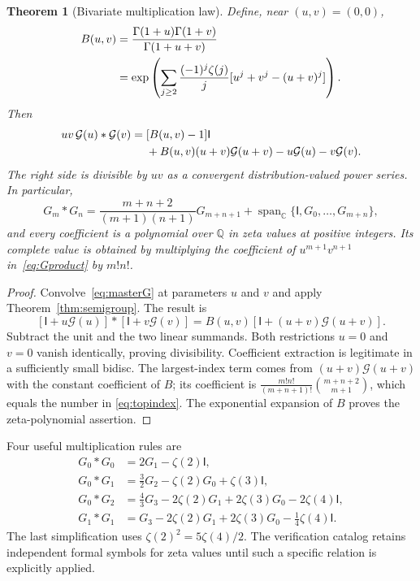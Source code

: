 \documentclass[11pt]{article}
\numberwithin{equation}{section}
\newtheorem{theorem}{Theorem}[section]
\theoremstyle{definition}
\theoremstyle{remark}
\newcommand{\C}{\mathbb C}
\newcommand{\Q}{\mathbb Q}
\newcommand{\Id}{\mathsf I}
\newcommand{\G}{\mathcal G}
\begin{document}
\begin{theorem}[Bivariate multiplication law]\label{thm:product}
Define, near $(u,v)=(0,0)$,
\begin{align}
 B(u,v)&=\frac{\Gamma(1+u)\Gamma(1+v)}{\Gamma(1+u+v)}\label{eq:Buv}\\
 &=\exp\left(\sum_{j\ge2}\frac{(-1)^j\zeta(j)}j
          [u^j+v^j-(u+v)^j]\right).\notag
\end{align}
Then
\begin{align}
 uv\,\G(u)*\G(v)={}&[B(u,v)-1]\Id\label{eq:Gproduct}\\
 &+B(u,v)(u+v)\G(u+v)-u\G(u)-v\G(v).\notag
\end{align}
The right side is divisible by $uv$ as a convergent distribution-valued
power series. In particular,
\begin{equation}\label{eq:topindex}
 G_m*G_n=\frac{m+n+2}{(m+1)(n+1)}G_{m+n+1}
       +\operatorname{span}_{\C}\{\Id,G_0,\ldots,G_{m+n}\},
\end{equation}
and every coefficient is a polynomial over $\Q$ in zeta values at positive
integers. Its complete value is obtained by multiplying the coefficient
of $u^{m+1}v^{n+1}$ in~\eqref{eq:Gproduct} by $m!n!$.
\end{theorem}
\begin{proof}
Convolve~\eqref{eq:masterG} at parameters $u$ and $v$ and apply
Theorem~\ref{thm:semigroup}. The result is
\[
 [\Id+u\G(u)]*[\Id+v\G(v)]
 =B(u,v)[\Id+(u+v)\G(u+v)].
\]
Subtract the unit and the two linear summands. Both restrictions $u=0$
and $v=0$ vanish identically, proving divisibility. Coefficient extraction
is legitimate in a sufficiently small bidisc. The largest-index term
comes from $(u+v)\G(u+v)$ with the constant coefficient of $B$; its
coefficient is
$\frac{m!n!}{(m+n+1)!}\binom{m+n+2}{m+1}$, which equals the number in
\eqref{eq:topindex}. The exponential expansion of $B$ proves the
zeta-polynomial assertion.
\end{proof}

Four useful multiplication rules are
\begin{align}
 G_0*G_0&=2G_1-\zeta(2)\Id,\label{eq:product00}\\
 G_0*G_1&=\frac32G_2-\zeta(2)G_0+\zeta(3)\Id,\label{eq:product01}\\
 G_0*G_2&=\frac43G_3-2\zeta(2)G_1+2\zeta(3)G_0-2\zeta(4)\Id,\label{eq:product02}\\
 G_1*G_1&=G_3-2\zeta(2)G_1+2\zeta(3)G_0-\frac14\zeta(4)\Id.
 \label{eq:product11}
\end{align}
The last simplification uses $\zeta(2)^2=5\zeta(4)/2$. The verification
catalog retains independent formal symbols for zeta values until such a
specific relation is explicitly applied.
\end{document}

